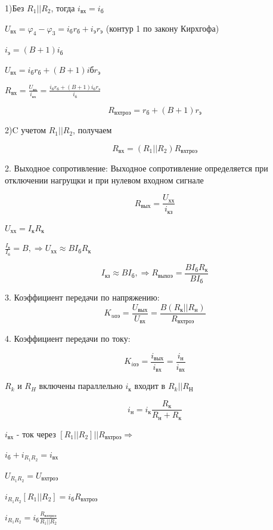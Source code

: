 \documentclass[12pt,a4paper]{article}
\begin{document}
1)Без $R_1 || R_2$, тогда $i_\textit{вх}=i_\textit{б}$

$U_\textit{вх}=\varphi_4-\varphi_3=i_\textit{б}r_\textit{б}+i_\textit{э}r_\textit{э}$
(контур 1 по закону Кирхгофа)

$i_\textit{э}=(B+1)i_\textit{б}$

$U_\textit{вх}=i_\textit{б}r_\textit{б}+(B+1)i\textit{б}r_\textit{э}$

$R_\textit{вх}=\frac{U_\textit{вх}}{i_\textit{вх}}=\frac{i_\textit{б}r_\textit{б}+(B+1)i_\textit{б}r_\textit{э}}{i_\textit{б}}$

$$
R_\textit{вхтроэ}=r_\textit{б} + (B+1)r_\textit{э}
$$

2)C учетом $R_1 || R_2$, получаем

$$
R_\textit{вх}=(R_1||R_2)R_\textit{вхтроэ}
$$

2. Выходное сопротивление:
 Выходное сопротивление определяется при отключении нагрущки и при нулевом входном сигнале
 
 $$R_\textit{вых}=\frac{U_\textit{хх}}{i_\textit{кз}}$$

$ U_\textit{хх}=I_\textit{к}R_\textit{к} $

$\frac{I_\textit{к}}{I_\textit{б}}=B,\Rightarrow U_\textit{хх}\approx BI_\textit{б}R_\textit{к}$

$$
I_\textit{кз}\approx BI_\textit{б},\Rightarrow R_\textit{выхоэ}=\frac{BI_\textit{б}R_\textit{к}}{BI_\textit{б}}
$$

3. Коэффициент передачи по напряжению:
$$
K_\textit{uоэ}=\frac{U_\textit{вых}}{U_\textit{вх}}=\frac{B(R_\textit{к}||R_\textit{н})}{R_\textit{вхтроэ}}
$$

4. Коэффициент передачи по току:

$$K_\textit{iоэ}=\frac{i_\textit{вых}}{i_\textit{вх}}=\frac{i_\textit{н}}{i_\textit{вх}}$$

$R_k \textit{ и } R_H$ включены параллельно $i_\textit{к}$ входит в $R_\textit{k}||R_\textit{Н}$

$$i_\textit{н}=i_\textit{к}\frac{R_\textit{к}}{R_\textit{н}+R_\textit{к}}$$

$i_\textit{вх}$ - ток через $[R_1||R_2]||R_\textit{вхтроэ}\Rightarrow$

$i_\textit{б}+i_{R_1R_2}=i_\textit{вх}$

$U_{R_1R_2}=U_\textit{вхтроэ}$

$i_{R_1R_2}[R_1||R_2]=i_\textit{б}R_\textit{вхтроэ}$

$i_{R_1R_2}=i_\textit{б}\frac{R_\textit{вхтроэ}}{R_1||R_2}$
\end{document}
